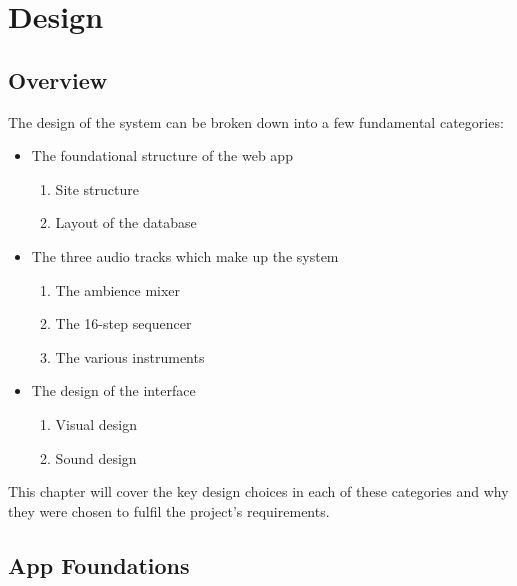 
\chapter{Design}

\section{Overview}
The design of the system can be broken down into a few fundamental categories:
\begin{itemize}
    \item 
        The foundational structure of the web app
        \begin{enumerate}
            \item Site structure
            \item Layout of the database
        \end{enumerate}
    \item 
        The three audio tracks which make up the system
        \begin{enumerate}
            \item The ambience mixer
            \item The 16-step sequencer
            \item The various instruments
        \end{enumerate}
    \item 
        The design of the interface
        \begin{enumerate}
            \item Visual design
            \item Sound design
        \end{enumerate}
\end{itemize}
This chapter will cover the key design choices in each of these categories and why they were chosen to fulfil the project’s requirements.

\section{App Foundations}

